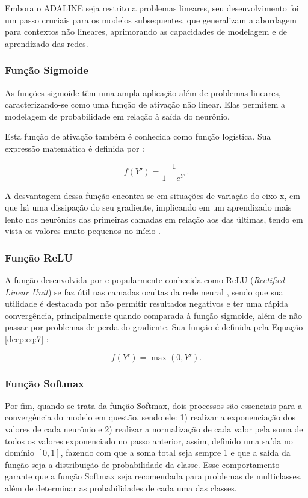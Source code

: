Embora o ADALINE seja restrito a problemas lineares, seu desenvolvimento foi um passo cruciais para os modelos subsequentes, que generalizam a abordagem para contextos não lineares, aprimorando as capacidades de modelagem e de aprendizado das redes.


\subsubsection{Função Sigmoide}
\label{deep:sigmoide}
As funções sigmoide têm uma ampla aplicação além de problemas lineares, caracterizando-se como uma função de ativação não linear. Elas permitem a modelagem de probabilidade em relação à saída do neurônio.

Esta função de ativação também é conhecida como função logística. Sua expressão matemática é definida por \citep{glorot2011deep}:

\begin{equation}
    \label{deep:eq:6}
    f(Y') = \frac{1}{1 + e^{Y'}}.
\end{equation}

A desvantagem dessa função encontra-se em situações de variação do eixo x, em que há uma dissipação do seu gradiente, implicando em um aprendizado mais lento nos neurônios das primeiras camadas em relação aos das últimas, tendo em vista os valores muito pequenos no início \citep{Goodfellow2016}.

\subsubsection{Função ReLU}
\label{deep:relu}
A função desenvolvida por \cite{Hahnioser2000} e popularmente conhecida como ReLU (\textit{Rectified Linear Unit}) se faz útil nas camadas ocultas da rede neural \citep{Goodfellow2016}, sendo que sua utilidade é destacada por não permitir resultados negativos \citep{Dahl2013} e ter uma rápida convergência, principalmente quando comparada à função sigmoide, além de não passar por problemas de perda do gradiente. Sua função é definida pela Equação \ref{deep:eq:7} \citep{Hahnioser2000}:

\begin{equation}
    \label{deep:eq:7}
    f(Y') = \max(0,Y').
\end{equation}

\subsubsection{Função Softmax}
\label{deep:soft}
Por fim, quando se trata da função Softmax, dois processos são essenciais para a convergência do modelo em questão, sendo ele: 1) realizar a exponenciação dos valores de cada neurônio e 2) realizar a normalização de cada valor pela soma de todos os valores exponenciado no passo anterior, assim, definido uma saída no domínio $[0,1]$, fazendo com que a soma total seja sempre 1 \citep{kotu2018data} e que a saída da função seja a distribuição de probabilidade da classe. Esse comportamento garante que a função Softmax seja recomendada para problemas de multiclasses, além de determinar as probabilidades de cada uma das classes.

